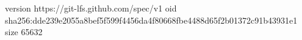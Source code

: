 version https://git-lfs.github.com/spec/v1
oid sha256:dde239e2055a8bef5f599f4456da4f80668fbe4488d65f2b01372c91b43931e1
size 65632

